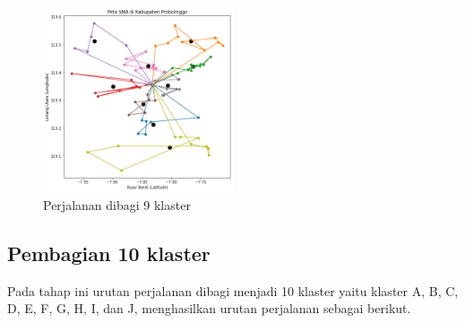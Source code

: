 \begin{figure}[H]
\centering
\includegraphics[width=0.5\textwidth]{Gambar/hasil_mtsp/9}
\caption{Perjalanan dibagi 9 klaster}
\label{fig:hasil_mtsp9}
\end{figure}

\subsection{Pembagian 10 klaster}

Pada tahap ini urutan perjalanan dibagi menjadi 10 klaster yaitu klaster A, B, C, D, E, F, G, H, I, dan J, menghasilkan urutan perjalanan sebagai berikut.

